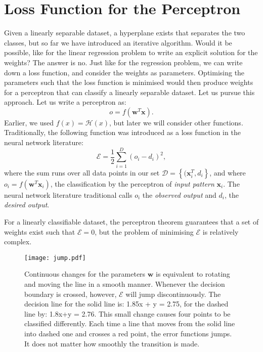 \section{Loss Function for the Perceptron}
\label{sec-percloss}
Given a linearly separable dataset, a hyperplane exists that separates the two classes, but so far we have introduced an iterative algorithm. Would it be possible,
like for the linear regression problem to write an explicit solution for the weights? The answer is no. Just like for the regression problem, we can
write down a loss function, and consider the weights as parameters. Optimising the parameters such that the loss function is minimised would then produce
weights for a perceptron that can classify a linearly separable dataset. Let us pursue this approach. Let us write a perceptron as:
\begin{equation}
  o = f(\boldsymbol{w}^T \boldsymbol{x}).
\end{equation}
Earlier, we used $f(x) = \mathcal{H}(x)$, but later we will consider other functions. Traditionally, the following function was introduced as  a loss function
in the neural network literature:
\begin{equation}
  \mathcal{E} = \frac{1}{2}\sum^D_{i=1}(o_i - d_i)^2,
  \label{eq-mse}
\end{equation}
where the sum runs over all data points in our set $\mathcal{D} = \left\{ (\boldsymbol{x}^T_i, d_i \right\}$, and where
$ o_i = f( \boldsymbol{w}^T \boldsymbol{x}_i)$, the classification by the perceptron of \emph{input pattern} $\boldsymbol{x}_i$. The neural
network literature traditional calls $o_i$ the \emph{observed output} and $d_i$, the \emph{desired output}.

For a linearly classifiable dataset, the perceptron theorem guarantees that a set of weights exist such that $\mathcal{E} = 0$, but the problem of
minimising $\mathcal{E}$ is relatively complex.
\begin{figure}[!ht]
  \begin{center}
    \texttt{[image: jump.pdf]}
  \end{center}
  \caption{Continuous changes for the parameters $\boldsymbol{w}$ is equivalent to rotating and moving the line in a smooth manner. Whenever the decision
    boundary is crossed, however, $\mathcal{E}$ will jump discontinuously. The decision line for the solid line is: 1.85x + y = 2.75, for the dashed line
    by: 1.8x+y = 2.76. This small change causes four points to be classified differently. Each time a line that moves from the solid line into dashed one and crosses
    a red point, the error functions jumps. It does not matter how smoothly the transition is made.
  }
\end{figure}

